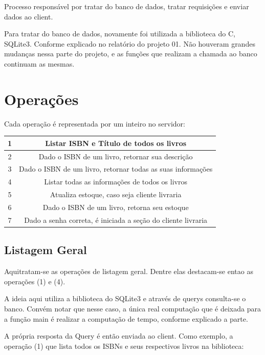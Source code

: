 \documentclass[10pt,a4paper]{report}
\begin{document}
Processo responsável por tratar do banco de dados, tratar requisições e enviar dados ao client.

	Para tratar do banco de dados, novamente foi utilizada a biblioteca do C, SQLite3. Conforme explicado no relatório do projeto 01. Não houveram grandes mudanças nessa parte do projeto, e as funções que realizam a chamada ao banco continuam as mesmas.
	
\section{Operações}
\begin{center}
 Cada operação é representada por um inteiro no servidor: \\
\begin{tabular}{|c|c|}
\hline 
1 & Listar ISBN e Título de todos os livros \\ 
\hline 
2 & Dado o ISBN de um livro, retornar sua descrição \\ 
\hline 
3 & Dado o ISBN de um livro, retornar todas as suas informações \\ 
\hline 
4 & Listar todas as informações de todos os livros  \\ 
\hline 
5 & Atualiza estoque, caso seja cliente livraria \\ 
\hline 
6 & Dado o ISBN de um livro, retorna seu estoque \\ 
\hline
7 & Dado a senha correta, é iniciada a seção do cliente livraria \\ 
\hline
\end{tabular}
 \end{center} 
\subsection{Listagem Geral}
Aquitratam-se as operações de listagem geral. Dentre elas destacam-se entao as operações (1) e (4).

	A ideia aqui utiliza a biblioteca do SQLite3 e através de querys consulta-se o banco. Convém notar que nesse caso, a única real computação que é deixada para a função main é realizar a computação de tempo, conforme explicado a parte.
	
	A própria resposta da Query é então enviada ao client. Como exemplo, a operação (1) que lista todos os ISBNs e seus respectivos livros na biblioteca:
\end{document}
